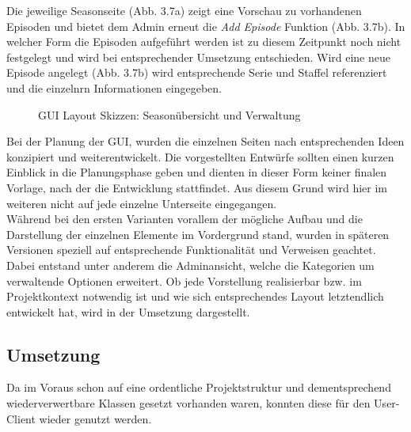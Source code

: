 \newpage

Die jeweilige Seasonseite (Abb. 3.7a) zeigt eine Vorschau zu vorhandenen Episoden und bietet dem Admin erneut die \textit{Add Episode} Funktion (Abb. 3.7b). In welcher Form die Episoden aufgeführt werden ist zu diesem Zeitpunkt noch nicht festgelegt und wird bei entsprechender Umsetzung entschieden. Wird eine neue Episode angelegt (Abb. 3.7b) wird entsprechende Serie und Staffel referenziert und die einzelnrn Informationen eingegeben.\\
\begin{figure} [h!]
\centering
\hfill %
\hfill %
\hfill %
\caption{GUI Layout Skizzen: Seasonübersicht und Verwaltung }
\label{gui-skizzen-season-verwaltung}
\end{figure}

Bei der Planung der GUI, wurden die einzelnen Seiten nach entsprechenden Ideen konzipiert und weiterentwickelt. Die vorgestellten Entwürfe sollten einen kurzen Einblick in die Planungsphase geben und dienten in dieser Form keiner finalen Vorlage, nach der die Entwicklung stattfindet. Aus diesem Grund wird hier im weiteren nicht auf jede einzelne Unterseite eingegangen.\\ Während bei den ersten Varianten vorallem der mögliche Aufbau und die Darstellung der einzelnen Elemente im Vordergrund stand, wurden in späteren Versionen speziell auf entsprechende Funktionalität und Verweisen geachtet. Dabei entstand unter anderem die Adminansicht, welche die Kategorien um verwaltende Optionen erweitert. Ob jede Vorstellung realisierbar bzw. im Projektkontext notwendig ist und wie sich entsprechendes Layout letztendlich entwickelt hat, wird in der Umsetzung dargestellt.\\

\newpage
\subsection{Umsetzung}

Da im Voraus schon auf eine ordentliche Projektstruktur und dementsprechend wiederverwertbare Klassen gesetzt vorhanden waren, konnten diese für den User-Client wieder genutzt werden.\\

